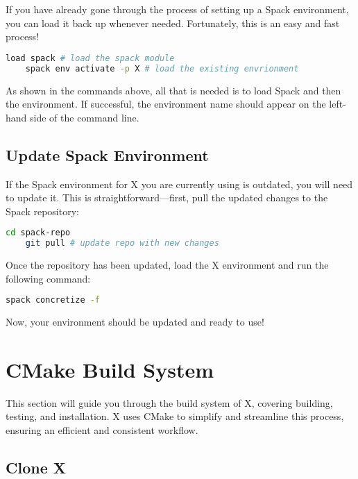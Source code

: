 \documentclass[a4paper,12pt]{article}
\begin{document}
If you have already gone through the process of setting up a Spack environment, you can load it back up whenever needed. Fortunately, this is an easy and fast process!

\vspace{1em} 
\begin{lstlisting}[language=bash]   
    load spack # load the spack module  
    spack env activate -p X # load the existing envrionment
\end{lstlisting}
\vspace{1em} 

As shown in the commands above, all that is needed is to load Spack and then the environment. If successful, the environment name should appear on the left-hand side of the command line.

\subsection{Update Spack Environment}

If the Spack environment for X you are currently using is outdated, you will need to update it. This is straightforward—first, pull the updated changes to the Spack repository:

\vspace{1em} 
\begin{lstlisting}[language=bash]   
    cd spack-repo 
    git pull # update repo with new changes
\end{lstlisting}
\vspace{1em} 

Once the repository has been updated, load the X environment and run the following command:

\vspace{1em} 
\begin{lstlisting}[language=bash]   
    spack concretize -f
\end{lstlisting}
\vspace{1em} 

Now, your environment should be updated and ready to use!

\section{CMake Build System}
This section will guide you through the build system of X, covering building, testing, and installation. X uses CMake to simplify and streamline this process, ensuring an efficient and consistent workflow.

\subsection{Clone X}
\end{document}
